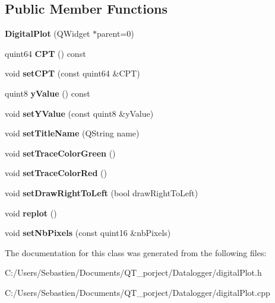 \subsection*{Public Member Functions}
\begin{DoxyCompactItemize}
\item 
\mbox{\label{class_digital_plot_a8e3127ffcc4dd5b0fd479439c7cb6f20}} 
{\bfseries Digital\+Plot} (Q\+Widget $\ast$parent=0)
\item 
\mbox{\label{class_digital_plot_a8bc240451b73acddfc1d9bcdd31ac345}} 
quint64 {\bfseries C\+PT} () const
\item 
\mbox{\label{class_digital_plot_aadb0daa4b7f46f98fde321962b564b27}} 
void {\bfseries set\+C\+PT} (const quint64 \&C\+PT)
\item 
\mbox{\label{class_digital_plot_a884cb57bb84351a2ba35610ab2effc60}} 
quint8 {\bfseries y\+Value} () const
\item 
\mbox{\label{class_digital_plot_a31f258f6eb0f26738b260a14b8191d02}} 
void {\bfseries set\+Y\+Value} (const quint8 \&y\+Value)
\item 
\mbox{\label{class_digital_plot_a4f654ab018a8080c2d42260013282784}} 
void {\bfseries set\+Title\+Name} (Q\+String name)
\item 
\mbox{\label{class_digital_plot_a4c4545547ae323bd13f1af1401c1d0d4}} 
void {\bfseries set\+Trace\+Color\+Green} ()
\item 
\mbox{\label{class_digital_plot_a5b3177989f5ed2102ce6b90ea8162b4b}} 
void {\bfseries set\+Trace\+Color\+Red} ()
\item 
\mbox{\label{class_digital_plot_aedc630a7c55bad65ac0540edee3ef4ea}} 
void {\bfseries set\+Draw\+Right\+To\+Left} (bool draw\+Right\+To\+Left)
\item 
\mbox{\label{class_digital_plot_ae72dfc8ad5e0c9ff50f12d06f8ce8aa6}} 
void {\bfseries replot} ()
\item 
\mbox{\label{class_digital_plot_ab634d93f6f8a1e9664a2b40047dbbc68}} 
void {\bfseries set\+Nb\+Pixels} (const quint16 \&nb\+Pixels)
\end{DoxyCompactItemize}


The documentation for this class was generated from the following files\+:\begin{DoxyCompactItemize}
\item 
C\+:/\+Users/\+Sebastien/\+Documents/\+Q\+T\+\_\+porject/\+Datalogger/digital\+Plot.\+h\item 
C\+:/\+Users/\+Sebastien/\+Documents/\+Q\+T\+\_\+porject/\+Datalogger/digital\+Plot.\+cpp\end{DoxyCompactItemize}
